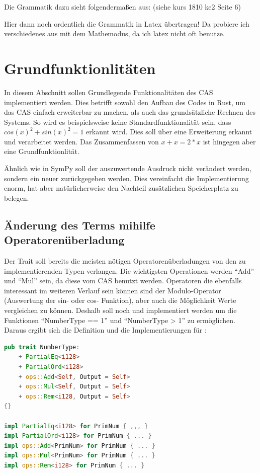 \documentclass[11pt,a4paper, ngerman]{article}
\begin{document}
Die Grammatik dazu sieht folgendermaßen aus: (siehe kurs 1810 ke2 Seite 6)

Hier dann noch ordentlich die Grammatik in Latex übertragen! Da probiere ich verschiedenes aus mit dem Mathemodus, da ich latex nicht oft benutze.

\newpage

\section{Grundfunktionlitäten}
In diesem Abschnitt sollen Grundlegende Funktionalitäten des CAS implementiert werden. Dies betrifft sowohl den Aufbau des Codes in Rust, um das CAS einfach erweiterbar zu machen, als auch das grundsätzliche Rechnen des Systems. So wird es beispielsweise keine Standardfunktionalität sein, dass $cos(x)^2+sin(x)^2 = 1$ erkannt wird. Dies soll über eine Erweiterung erkannt und verarbeitet werden. Das Zusammenfassen von $x+x=2*x$ ist hingegen aber eine Grundfunktionlität.

Ähnlich wie in SymPy soll der auszuwertende Ausdruck nicht verändert werden, sondern ein neuer zurückgegeben werden. Dies vereinfacht die Implementierung enorm, hat aber natürlicherweise den Nachteil zusätzlichen Speicherplatz zu belegen.

\subsection{Änderung des Terms mihilfe Operatorenüberladung}
Der Trait  soll bereits die meisten nötigen Operatorenüberladungen von den zu implementierenden Typen verlangen. Die wichtigsten Operationen werden ``Add'' und ``Mul'' sein, da diese vom CAS benutzt werden. Operatoren die ebenfalls interessant im weiteren Verlauf sein können sind der Modulo-Operator (Auswertung der sin- oder cos- Funktion), aber auch die Möglichkeit Werte vergleichen zu können. Deshalb soll noch  und  implementiert werden um die Funktionen ``NumberType == 1'' und ``NumberType > 1'' zu ermöglichen. Daraus ergibt sich die Definition und die Implementierungen für :

\begin{lstlisting}[language=rust, caption={trait NumberType 1. Iteration}]
pub trait NumberType:
    + PartialEq<i128>
    + PartialOrd<i128>
    + ops::Add<Self, Output = Self>
    + ops::Mul<Self, Output = Self>
    + ops::Rem<i128, Output = Self>
{}

impl PartialEq<i128> for PrimNum { ,,, }
impl PartialOrd<i128> for PrimNum { ... }
impl ops::Add<PrimNum> for PrimNum { ... }
impl ops::Mul<PrimNum> for PrimNum { ... }
impl ops::Rem<i128> for PrimNum { ... }
\end{lstlisting}
\end{document}

